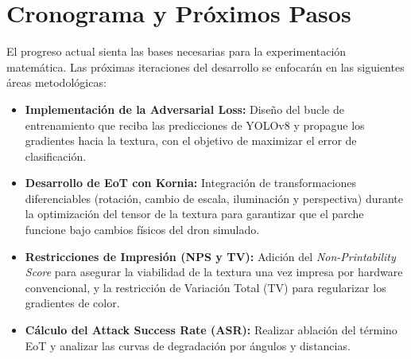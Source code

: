 \documentclass[12pt,a4paper]{article}
\begin{document}
\section{Cronograma y Próximos Pasos}

El progreso actual sienta las bases necesarias para la experimentación matemática. Las próximas iteraciones del desarrollo se enfocarán en las siguientes áreas metodológicas:

\begin{itemize}
    \item \textbf{Implementación de la Adversarial Loss:} Diseño del bucle de entrenamiento que reciba las predicciones de YOLOv8 y propague los gradientes hacia la textura, con el objetivo de maximizar el error de clasificación.
    \item \textbf{Desarrollo de EoT con Kornia:} Integración de transformaciones diferenciables (rotación, cambio de escala, iluminación y perspectiva) durante la optimización del tensor de la textura para garantizar que el parche funcione bajo cambios físicos del dron simulado.
    \item \textbf{Restricciones de Impresión (NPS y TV):} Adición del \textit{Non-Printability Score} para asegurar la viabilidad de la textura una vez impresa por hardware convencional, y la restricción de Variación Total (TV) para regularizar los gradientes de color.
    \item \textbf{Cálculo del Attack Success Rate (ASR):} Realizar ablación del término EoT y analizar las curvas de degradación por ángulos y distancias.
\end{itemize}
\end{document}
